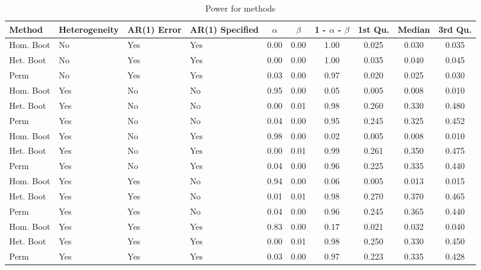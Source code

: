 \documentclass{article}
\begin{document}
\begin{landscape}
\begin{table}[ht]
\centering
\begin{tabular}{llllcccccc}
  \hline
Method & Heterogeneity & AR(1) Error & AR(1) Specified & $\alpha$ & $\beta$ & 1 - $\alpha$ - $\beta$ & 1st Qu. & Median & 3rd Qu.  \\ 
  \hline
Hom. Boot & No & Yes & Yes & 0.00 & 0.00 & 1.00 & 0.025 & 0.030 & 0.035 \\ 
  Het. Boot & No & Yes & Yes & 0.00 & 0.00 & 1.00 & 0.035 & 0.040 & 0.045 \\ 
  Perm & No & Yes & Yes & 0.03 & 0.00 & 0.97 & 0.020 & 0.025 & 0.030 \\ \hline
  Hom. Boot & Yes & No & No & 0.95 & 0.00 & 0.05 & 0.005 & 0.008 & 0.010 \\ 
  Het. Boot & Yes & No & No & 0.00 & 0.01 & 0.98 & 0.260 & 0.330 & 0.480 \\ 
  Perm & Yes & No & No & 0.04 & 0.00 & 0.95 & 0.245 & 0.325 & 0.452 \\ \hline
  Hom. Boot & Yes & No & Yes & 0.98 & 0.00 & 0.02 & 0.005 & 0.008 & 0.010 \\ 
  Het. Boot & Yes & No & Yes & 0.00 & 0.01 & 0.99 & 0.261 & 0.350 & 0.475 \\ 
  Perm & Yes & No & Yes & 0.04 & 0.00 & 0.96 & 0.225 & 0.335 & 0.440 \\ \hline
  Hom. Boot & Yes & Yes & No & 0.94 & 0.00 & 0.06 & 0.005 & 0.013 & 0.015 \\ 
  Het. Boot & Yes & Yes & No & 0.01 & 0.01 & 0.98 & 0.270 & 0.370 & 0.465 \\ 
  Perm & Yes & Yes & No & 0.04 & 0.00 & 0.96 & 0.245 & 0.365 & 0.440 \\ \hline
  Hom. Boot & Yes & Yes & Yes & 0.83 & 0.00 & 0.17 & 0.021 & 0.032 & 0.040 \\ 
  Het. Boot & Yes & Yes & Yes & 0.00 & 0.01 & 0.98 & 0.250 & 0.330 & 0.450 \\ 
  Perm & Yes & Yes & Yes & 0.03 & 0.00 & 0.97 & 0.223 & 0.335 & 0.428 \\ 
   \hline
\end{tabular}
\caption{Power for methods} 
\label{tab:power_methods_full}
\end{table}
\end{landscape}
\end{document}

